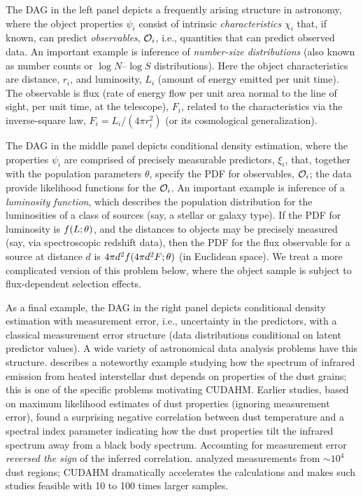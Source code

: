 The DAG in the left panel depicts a frequently arising structure in astronomy, where the object properties $\psi_i$ consist of intrinsic \emph{characteristics} $\chi_i$ that, if known, can predict \emph{observables}, $\mathcal{O}_i$, i.e., quantities that can predict observed data.
An important example is inference of \emph{number-size distributions} (also known as number counts or $\log N$--$\log S$ distributions).
Here the object characteristics are distance, $r_i$, and luminosity, $L_i$ (amount of energy emitted per unit time).
The observable is flux (rate of energy flow per unit area normal to the line of sight, per unit time, at the telescope), $F_i$, related to the characteristics via the inverse-square law, $F_i = L_i/(4\pi r_i^2)$ (or its cosmological generalization).

The DAG in the middle panel depicts conditional density estimation, where the properties $\psi_i$ are comprised of precisely measurable predictors, $\xi_i$, that, together with the population parameters $\theta$, specify the PDF for observables, $\mathcal{O}_i$; the data provide likelihood functions for the $\mathcal{O}_i$.
An important example is inference of a \emph{luminosity function}, which describes the population distribution for the luminosities of a class of sources (say, a stellar or galaxy type).
If the PDF for luminosity is $f(L;\theta)$, and the distances to objects may be precisely measured (say, via spectroscopic redshift data), then the PDF for the flux observable for a source at distance $d$ is $4\pi d^2 f(4\pi d^2 F; \theta)$ (in Euclidean space).
We treat a more complicated version of this problem below, where the object sample is subject to flux-dependent selection effects.

As a final example, the DAG in the right panel depicts conditional density estimation with measurement error, i.e., uncertainty in the predictors, with a classical measurement error structure (data distributions conditional on latent predictor values).
A wide variety of astronomical data analysis problems have this structure.
\cite{K+12-DustSEDs} describes a noteworthy example studying how the spectrum of infrared emission from heated interstellar dust depends on properties of the dust grains; this is one of the specific problems motivating CUDAHM.
Earlier studies, based on maximum likelihood estimates of dust properties (ignoring measurement error), found a surprising negative correlation between dust temperature and a spectral index parameter indicating how the dust properties tilt the infrared spectrum away from a black body spectrum.
Accounting for measurement error \emph{reversed the sign} of the inferred correlation.
\cite{K+12-DustSEDs} analyzed measurements from $\sim 10^4$ dust regions; CUDAHM dramatically accelerates the calculations and makes such studies feasible with 10 to 100 times larger samples.


